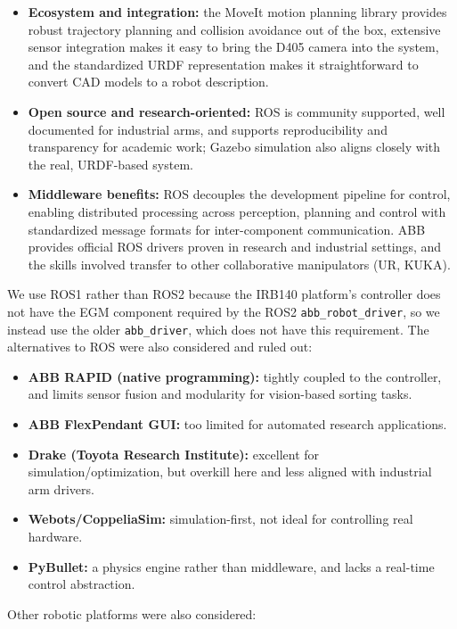 \documentclass[11pt,a4paper]{report}
\begin{document}
\begin{itemize}
  \item \textbf{Ecosystem and integration:} the MoveIt motion planning library provides robust
  trajectory planning and collision avoidance out of the box, extensive sensor integration makes
  it easy to bring the D405 camera into the system, and the standardized URDF representation makes
  it straightforward to convert CAD models to a robot description.
  \item \textbf{Open source and research-oriented:} ROS is community supported, well documented
  for industrial arms, and supports reproducibility and transparency for academic work; Gazebo
  simulation also aligns closely with the real, URDF-based system.
  \item \textbf{Middleware benefits:} ROS decouples the development pipeline for control, enabling
  distributed processing across perception, planning and control with standardized message
  formats for inter-component communication. ABB provides official ROS drivers proven in research
  and industrial settings, and the skills involved transfer to other collaborative manipulators
  (UR, KUKA).
\end{itemize}

We use ROS1 rather than ROS2 because the IRB140 platform's controller does not have the EGM
component required by the ROS2 \texttt{abb\_robot\_driver}, so we instead use the older
\texttt{abb\_driver}, which does not have this requirement. The alternatives to ROS were also
considered and ruled out:

\begin{itemize}
  \item \textbf{ABB RAPID (native programming):} tightly coupled to the controller, and limits
  sensor fusion and modularity for vision-based sorting tasks.
  \item \textbf{ABB FlexPendant GUI:} too limited for automated research applications.
  \item \textbf{Drake (Toyota Research Institute):} excellent for simulation/optimization, but
  overkill here and less aligned with industrial arm drivers.
  \item \textbf{Webots/CoppeliaSim:} simulation-first, not ideal for controlling real hardware.
  \item \textbf{PyBullet:} a physics engine rather than middleware, and lacks a real-time control
  abstraction.
\end{itemize}

Other robotic platforms were also considered:
\end{document}
